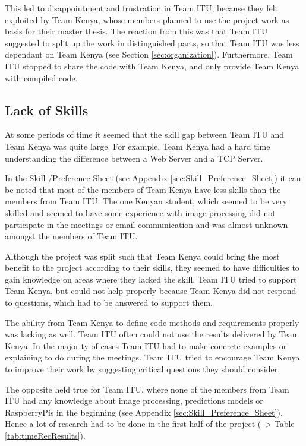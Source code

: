 This led to disappointment and frustration in Team ITU, because they felt exploited by Team Kenya, whose members planned to use the project work as basis for their master thesis. The reaction from this was that Team ITU suggested to split up the work in distinguished parts, so that Team ITU was less dependant on Team Kenya (see Section \ref{sec:organization}). Furthermore, Team ITU stopped to share the code with Team Kenya, and only provide Team Kenya with compiled code.


\subsection{Lack of Skills}
At some periods of time it seemed that the skill gap between Team ITU and Team Kenya was quite large. For example, Team Kenya had a hard time understanding the difference between a Web Server and a TCP Server.

In the Skill-/Preference-Sheet (see Appendix \ref{sec:Skill_Preference_Sheet}) it can be noted that most of the members of Team Kenya have less skills than the members from Team ITU. The one Kenyan student, which seemed to be very skilled and seemed to have some experience with image processing did not participate in the meetings or email communication and was almost unknown amongst the members of Team ITU.

Although the project was split such that Team Kenya could bring the most benefit to the project according to their skills, they seemed to have difficulties to gain knowledge on areas where they lacked the skill. Team ITU tried to support Team Kenya, but could not help properly because Team Kenya did not respond to questions, which had to be answered to support them. 

The ability from Team Kenya to define code methods and requirements properly was lacking as well. Team ITU often could not use the results delivered by Team Kenya. In the majority of cases Team ITU had to make concrete examples or explaining to do during the meetings. Team ITU tried to encourage Team Kenya to improve their work by suggesting critical questions they should consider.

The opposite held true for Team ITU, where none of the members from Team ITU had any knowledge about image processing, predictions models or RaspberryPis in the beginning (see Appendix \ref{sec:Skill_Preference_Sheet}). Hence a lot of research had to be done in the first half of the project (--> Table \ref{tab:timeRecResults}).

